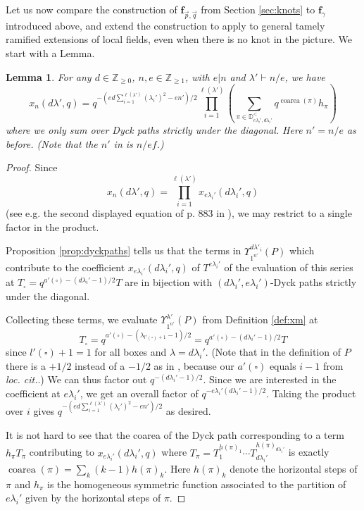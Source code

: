 \documentclass{amsart}
\numberwithin{equation}{section}
\newtheorem{lemma}{Lemma}[section]
\theoremstyle{definition}
\newcommand{\frs}{\mathbf{f}_{\vec{p},\vec{q}}}
\newcommand{\fpq}{\frs}
\newcommand{\fgamma}{\mathbf{f}_{\gamma}}
\newcommand{\Z}{{\mathbb Z}}
\newcommand{\Dyck}{\mathbb{D}}
\DeclareMathOperator{\coarea}{\mathrm{coarea}}
\begin{document}
Let us now compare the construction of $\fpq$ from Section \ref{sec:knots} to $\fgamma$ introduced above, and extend the construction to apply to general tamely ramified extensions of local fields, even when there is no knot in the picture.
We start with a Lemma.
\begin{lemma}
\label{lem:comparedycktoW2} For any $d\in\Z_{\ge 0}$, $n,e\in\Z_{\ge 1}$, with $e|n$ and $\lambda'\vdash n/e$, we have 
$$x_{n}(d\lambda',q)=q^{-(ed\sum_{i=1}^{\ell(\lambda')}(\lambda_i')^2-en')/2}\prod_{i=1}^{\ell(\lambda')}\left(
\sum_{\pi \in \Dyck^<_{e\lambda_i',d\lambda_i'}}q^{\coarea(\pi)}h_\pi\right)$$ where we only sum over Dyck paths strictly under the diagonal. Here $n'=n/e$ as before. (Note that the $n'$ in \cite{W2} is $n/ef$.)
\end{lemma}
\begin{proof}
Since $$x_{n}(d\lambda',q)=\prod_{i=1}^{\ell(\lambda')}x_{e\lambda_i'}(d\lambda_i',q)$$ (see e.g. the second displayed equation of p. 883 in \cite{W2}),
we may restrict to a single factor in the product. 

Proposition \ref{prop:dyckpaths} tells us that the terms in $\Upsilon^{d\lambda'_i}_{1^{n'}}(P)$ which contribute to the coefficient $x_{e\lambda_i'}(d\lambda_i',q)$ of $T^{e\lambda_i'}$ 
of the evaluation of this series at $T_\square=q^{a'(\square)-(d\lambda_i'-1)/2}T$ are in bijection with $(d{\lambda_i'},e\lambda_i')$-Dyck paths strictly under the diagonal.

Collecting these terms, we evaluate $\Upsilon^{\lambda'}_{1^{n'}}(P)$ from Definition \ref{def:xm} at $$T_\square=q^{a'(\square)-(\lambda_{l'(\square)+1}-1)/2}=q^{a'(\square)-(d\lambda_i'-1)/2}T$$ since $l'(\square)+1=1$ for all boxes and $\lambda=d\lambda_i'$. (Note that in the definition of $P$ there is a $+1/2$ instead of a $-1/2$ as in \cite[V 12]{W2}, because our $a'(\square)$ equals $i-1$ from {\em loc. cit.}.)  We can thus factor out $q^{-(d\lambda_i'-1)/2}$. Since we are interested in the coefficient at $e\lambda_i'$, we get an overall factor of $q^{-e\lambda_i'(d\lambda_i'-1)/2}$. Taking the product over $i$ gives 
$q^{-(ed\sum_{i=1}^{\ell(\lambda')}(\lambda_i')^2-en')/2}$ as desired. 

It is not hard to see that the coarea of the Dyck path corresponding to a term $h_\pi T_\pi$ contributing to $x_{e\lambda_i'}(d\lambda_i',q)$ where $T_\pi=T_1^{h(\pi)_1}\cdots T_{d\lambda_i'}^{h(\pi)_{d\lambda_i'}}$ is exactly $\coarea(\pi)=\sum_k (k-1) h(\pi)_k$. Here $h(\pi)_k$ denote the horizontal steps of $\pi$ and $h_\pi$ is the homogeneous symmetric function associated to the partition of $e\lambda_i'$ given by the horizontal steps of $\pi$.


\end{proof}
\end{document}
